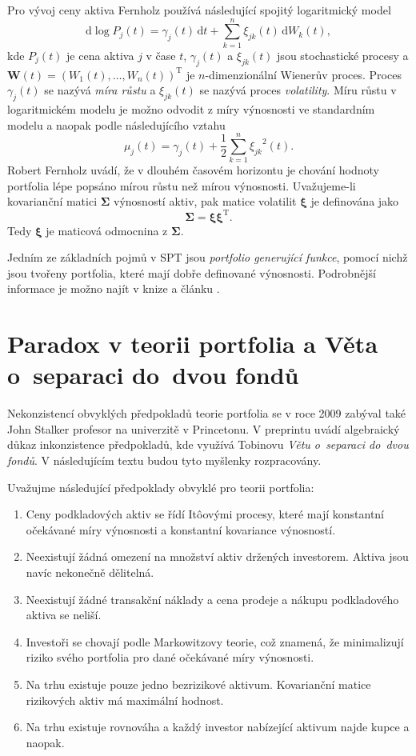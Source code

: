 \documentclass[a4paper,12pt]{report}
\theoremstyle{definition} \newtheorem{definice}[veta]{Definice}
\theoremstyle{remark}
\begin{document}
Pro vývoj ceny aktiva Fernholz používá následující spojitý logaritmický model
$$\mathrm{d}\log P_j(t)=\gamma_j(t)\,\mathrm{d}t+\sum_{k=1}^{n}\xi_{jk}(t)\,\mathrm{d}W_k(t),$$
kde $P_j(t)$ je cena aktiva $j$ v čase $t$, $\gamma_j(t)$ a $\xi_{jk}(t)$ jsou stochastické procesy a $\boldsymbol{W}(t)=(W_1(t),\dots,W_n(t))^\mathrm{T}$ je $n$-dimenzionální Wienerův proces. 
Proces $\gamma_j(t)$ se nazývá \textit{míra růstu} a $\xi_{jk}(t)$ se nazývá proces \textit{volatility}.
Míru růstu v logaritmickém modelu je možno odvodit z míry výnosnosti ve standardním modelu a naopak podle následujícího vztahu
$$\mu_j(t)=\gamma_j(t)+\frac12\sum_{k=1}^{n}{\xi_{jk}}^2(t).$$
Robert Fernholz uvádí, že v dlouhém časovém horizontu je chování hodnoty portfolia lépe popsáno mírou růstu než mírou výnosnosti.
Uvažujeme-li kovarianční matici $\boldsymbol{\Sigma}$ výnosností aktiv, pak matice volatilit $\boldsymbol{\xi}$ je definována jako
$$\boldsymbol{\Sigma}=\boldsymbol{\xi}\boldsymbol{\xi}^\mathrm{T}.$$
Tedy $\boldsymbol{\xi}$ je maticová odmocnina z $\boldsymbol{\Sigma}$.

Jedním ze základních pojmů v SPT jsou \textit{portfolio generující funkce}, pomocí nichž jsou tvořeny portfolia, které mají dobře definované výnosnosti. Podrobnější informace je možno najít v knize \cite{fern} a článku \cite{kara}.




\section{Paradox v teorii portfolia a Věta o~separaci do~dvou fondů} \label{john}
Nekonzistencí obvyklých předpokladů teorie portfolia se v roce 2009 zabýval také John Stalker profesor na univerzitě v Princetonu. 
V preprintu \cite{john} uvádí algebraický důkaz inkonzistence předpokladů, kde využívá Tobinovu \textit{Větu o~separaci do~dvou fondů}. 
V následujícím textu budou tyto myšlenky rozpracovány.

Uvažujme následující předpoklady obvyklé pro teorii portfolia:
\begin{enumerate}
\item \label{predpoklad_konstantnosti_vynosu_a_rizika} Ceny podkladových aktiv se řídí It\^oovými procesy, které mají konstantní očekávané míry výnosnosti a konstantní kovariance výnosností. 
\item Neexistují žádná omezení na množství aktiv držených investorem. Aktiva jsou navíc nekonečně dělitelná.
\item Neexistují žádné transakční náklady a cena prodeje a nákupu podkladového aktiva se neliší.
\item Investoři se chovají podle Markowitzovy teorie, což znamená, že minimalizují riziko svého portfolia pro dané očekávané míry výnosnosti.
\item \label{predpoklad_hodnost} Na trhu existuje pouze jedno bezrizikové aktivum. Kovarianční matice rizikových aktiv má maximální hodnost.
\item \label{predpoklad_konstantnosti_N} Na trhu existuje rovnováha a každý investor nabízející aktivum najde kupce a naopak.
\end{enumerate}
\end{document}
